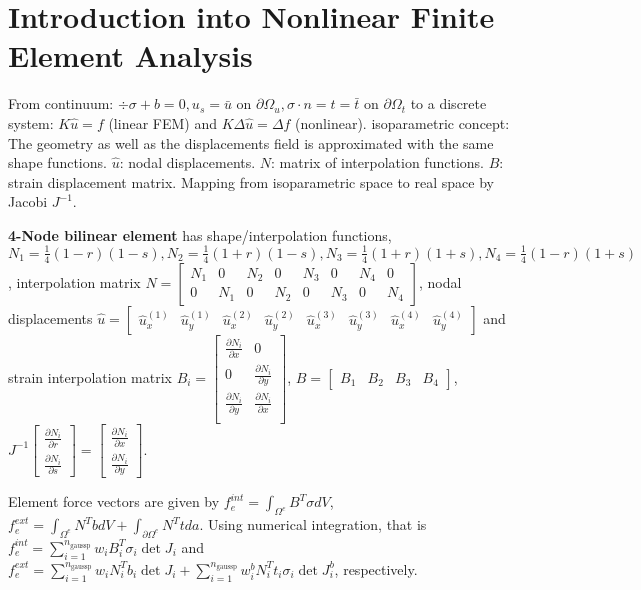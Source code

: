 \section*{Introduction into Nonlinear Finite Element Analysis}

From continuum: $\div{\sigma} + b = 0, u_s = \bar{u} \text{ on } \partial\Omega_u, \sigma \cdot n = t = \bar{t} \text{ on } \partial\Omega_t$
to a discrete system: $K\hat{u}=f$ (linear FEM) and $K\Delta \hat{u} = \Delta f$ (nonlinear).
isoparametric concept: 
The geometry as well as the displacements field is approximated with the same shape functions.
$\hat{u}$: nodal displacements. $N$: matrix of interpolation functions. $B$: strain displacement matrix.
Mapping from isoparametric space to real space by Jacobi $J^{-1}$.

\textbf{4-Node bilinear element}
has shape/interpolation functions, $N_1 = \frac{1}{4}(1-r)(1-s), N_2 = \frac{1}{4}(1+r)(1-s), N_3 = \frac{1}{4}(1+r)(1+s), N_4 = \frac{1}{4}(1-r)(1+s)$, interpolation matrix $N=
\begin{bmatrix}
N_1 & 0 & N_2 & 0 & N_3 & 0 & N_4 & 0 \\
0 & N_1 & 0 & N_2 & 0 & N_3 & 0 & N_4
\end{bmatrix}$, nodal displacements $\hat{u} = \begin{bmatrix}
\hat{u}_x^{(1)} & \hat{u}_y^{(1)} & \hat{u}_x^{(2)} & \hat{u}_y^{(2)} &
\hat{u}_x^{(3)} & \hat{u}_y^{(3)} & \hat{u}_x^{(4)} & \hat{u}_y^{(4)}
\end{bmatrix}$ and strain interpolation matrix $B_i = \begin{bmatrix}
\frac{\partial N_i}{\partial x} & 0 \\
0 & \frac{\partial N_i}{\partial y} \\
\frac{\partial N_i}{\partial y} & \frac{\partial N_i}{\partial x} \\
\end{bmatrix}$, $B= \begin{bmatrix}
B_1 & B_2 & B_3 & B_4
\end{bmatrix}$, $J^{-1}\begin{bmatrix}
\frac{\partial N_i}{\partial r} \\
\frac{\partial N_i}{\partial s}
\end{bmatrix} =\begin{bmatrix}
\frac{\partial N_i}{\partial x} \\
\frac{\partial N_i}{\partial y}
\end{bmatrix}$.

Element force vectors are given by
$f_e^{int} = \int_{\Omega^e} B^T \sigma dV$, $f_e^{ext} = \int_{\Omega^e} N^T b  dV + \int_{\partial\Omega^e} N^T t  da$.
Using numerical integration, that is $f_e^{int} = \sum_{i=1}^{n_{\text{gaussp}}} w_i B_i ^T \sigma_i \det{J_i}$ and $f_e^{ext} = \sum_{i=1}^{n_{\text{gaussp}}} w_i N_i ^T b_i \det{J_i} + \sum_{i=1}^{n_{\text{gaussp}}} w_i^b N_i ^T t_i \sigma_i \det{J_i^b}$, respectively.


